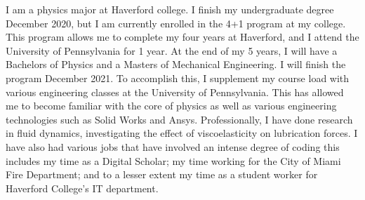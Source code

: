 %
%
%
\par{
I am a physics major at Haverford college. I finish my undergraduate degree December 2020, but I am currently enrolled in the 4+1 program at my college. This program allows me to complete my four years at Haverford, and I attend the University of Pennsylvania for 1 year. At the end of my 5 years, I will have a Bachelors of Physics and a Masters of Mechanical Engineering. I will finish the program December 2021. To accomplish this, I supplement my course load with various engineering classes at the University of Pennsylvania. This has allowed me to become familiar with the core of physics as well as various engineering technologies such as Solid Works and Ansys. Professionally, I have done research in fluid dynamics, investigating the effect of viscoelasticity on lubrication forces. I have also had various jobs that have involved an intense degree of coding this includes my time as a Digital Scholar; my time working for the City of Miami Fire Department; and to a lesser extent my time as a student worker for Haverford College's IT department.
}